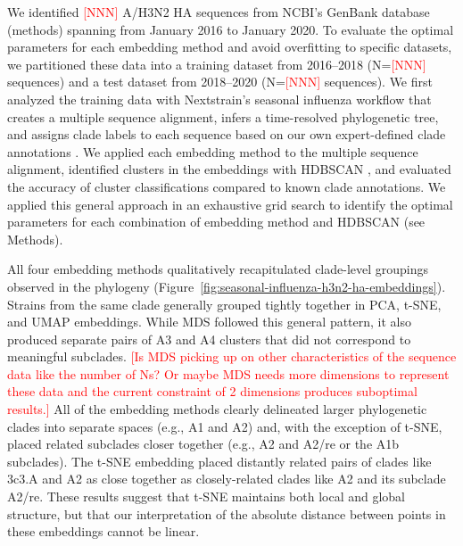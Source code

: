 \documentclass[9pt,lineno]{elife}
\def\jhc#1{\textcolor{red}{[#1]}}
\begin{document}
We identified \jhc{NNN} A/H3N2 HA sequences from NCBI's GenBank database (methods) spanning from January 2016 to January 2020.
To evaluate the optimal parameters for each embedding method and avoid overfitting to specific datasets, we partitioned these data into a training dataset from 2016--2018 (N=\jhc{NNN} sequences) and a test dataset from 2018--2020 (N=\jhc{NNN} sequences).
We first analyzed the training data with Nextstrain's seasonal influenza workflow that creates a multiple sequence alignment, infers a time-resolved phylogenetic tree, and assigns clade labels to each sequence based on our own expert-defined clade annotations \citep{nextstrain,seasonal-flu,augur}.
We applied each embedding method to the multiple sequence alignment, identified clusters in the embeddings with HDBSCAN \citep{hdbscan}, and evaluated the accuracy of cluster classifications compared to known clade annotations.
We applied this general approach in an exhaustive grid search to identify the optimal parameters for each combination of embedding method and HDBSCAN (see Methods).

All four embedding methods qualitatively recapitulated clade-level groupings observed in the phylogeny (Figure~\ref{fig:seasonal-influenza-h3n2-ha-embeddings}).
Strains from the same clade generally grouped tightly together in PCA, t-SNE, and UMAP embeddings.
While MDS followed this general pattern, it also produced separate pairs of A3 and A4 clusters that did not correspond to meaningful subclades.
\jhc{Is MDS picking up on other characteristics of the sequence data like the number of Ns? Or maybe MDS needs more dimensions to represent these data and the current constraint of 2 dimensions produces suboptimal results.}
All of the embedding methods clearly delineated larger phylogenetic clades into separate spaces (e.g., A1 and A2) and, with the exception of t-SNE, placed related subclades closer together (e.g., A2 and A2/re or the A1b subclades).
The t-SNE embedding placed distantly related pairs of clades like 3c3.A and A2 as close together as closely-related clades like A2 and its subclade A2/re.
These results suggest that t-SNE maintains both local and global structure, but that our interpretation of the absolute distance between points in these embeddings cannot be linear.
\end{document}
